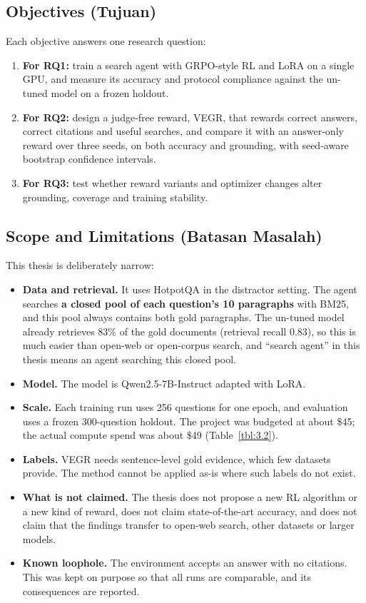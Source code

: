 \subsection{Objectives (Tujuan)}\label{sec:1.3}

Each objective answers one research question:

\begin{enumerate}
\def\labelenumi{\arabic{enumi}.}
\tightlist
\item
  \textbf{For RQ1:} train a search agent with GRPO-style RL and LoRA on
  a single GPU, and measure its accuracy and protocol compliance against
  the un-tuned model on a frozen holdout.
\item
  \textbf{For RQ2:} design a judge-free reward, VEGR, that rewards
  correct answers, correct citations and useful searches, and compare it
  with an answer-only reward over three seeds, on both accuracy and
  grounding, with seed-aware bootstrap confidence intervals.
\item
  \textbf{For RQ3:} test whether reward variants and optimizer changes
  alter grounding, coverage and training stability.
\end{enumerate}

\subsection{Scope and Limitations (Batasan Masalah)}\label{sec:1.4}

This thesis is deliberately narrow:

\begin{itemize}
\tightlist
\item
  \textbf{Data and retrieval.} It uses HotpotQA in the distractor
  setting. The agent searches \textbf{a closed pool of each question's
  10 paragraphs} with BM25, and this pool always contains both gold
  paragraphs. The un-tuned model already retrieves 83\% of the gold
  documents (retrieval recall 0.83), so this is much easier than
  open-web or open-corpus search, and ``search agent'' in this thesis
  means an agent searching this closed pool.
\item
  \textbf{Model.} The model is Qwen2.5-7B-Instruct adapted with LoRA.
\item
  \textbf{Scale.} Each training run uses 256 questions for one epoch,
  and evaluation uses a frozen 300-question holdout. The project was
  budgeted at about \$45; the actual compute spend was about \$49
  (Table~\ref{tbl:3.2}).
\item
  \textbf{Labels.} VEGR needs sentence-level gold evidence, which few
  datasets provide. The method cannot be applied as-is where such labels
  do not exist.
\item
  \textbf{What is not claimed.} The thesis does not propose a new RL
  algorithm or a new kind of reward, does not claim state-of-the-art
  accuracy, and does not claim that the findings transfer to open-web
  search, other datasets or larger models.
\item
  \textbf{Known loophole.} The environment accepts an answer with no
  citations. This was kept on purpose so that all runs are comparable,
  and its consequences are reported.
\end{itemize}

